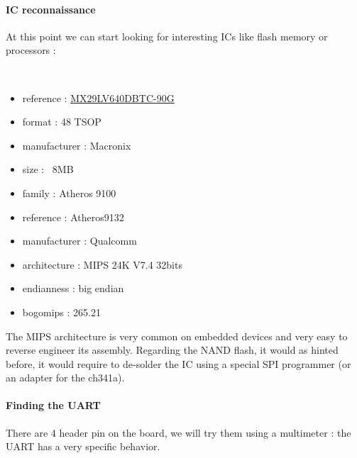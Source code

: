 \documentclass{article}
\begin{document}
\paragraph{IC reconnaissance} At this point we can start looking for interesting ICs like flash memory or processors :

\\
\begin{minipage}[t]{0.3\textwidth}
\end{minipage} %
\vspace{0.5cm}
\hfill
\begin{minipage}[t]{0.7\textwidth}
	\begin{itemize}
		\itemsep0em
		\item reference : \href{https://www.alldatasheet.com/datasheet-pdf/view/267962/MCNIX/MX29LV640DBTC-90G.html}{MX29LV640DBTC-90G}
		\item format : 48 TSOP
		\item manufacturer : Macronix
		\item size : ~8MB
	\end{itemize}
\end{minipage}
\begin{minipage}[t]{0.3\textwidth}
\end{minipage} %
\vspace{0.5cm}
\hfill
\begin{minipage}[t]{0.7\textwidth}
	\begin{itemize}
		\item family : Atheros 9100
		\item reference : Atheros9132
		\item manufacturer : Qualcomm
		\item architecture : MIPS 24K V7.4 32bits
		\item endianness : big endian
		\item bogomips : 265.21
	\end{itemize}
\end{minipage}
\noindent The MIPS architecture is very common on embedded devices and very easy to reverse engineer its assembly. Regarding the NAND flash, it would as hinted before, it would require to de-solder the IC using a special SPI programmer (or an adapter for the ch341a).
\paragraph{Finding the UART} There are 4 header pin on the board, we will try them using a multimeter : the UART has a very specific behavior.
\end{document}
